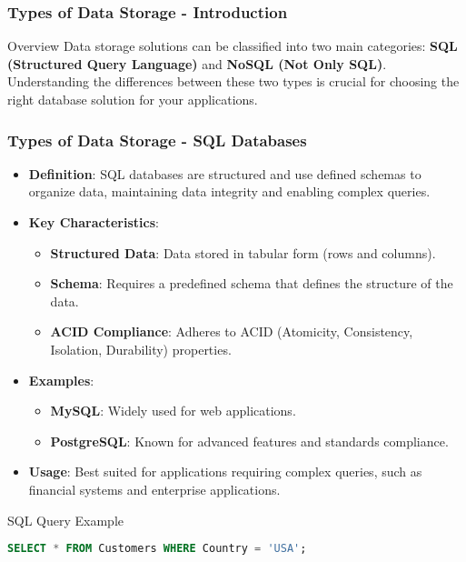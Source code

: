 \documentclass[aspectratio=169]{beamer}
\begin{document}
\begin{frame}[fragile]
    \frametitle{Types of Data Storage - Introduction}
    \begin{block}{Overview}
        Data storage solutions can be classified into two main categories: 
        \textbf{SQL (Structured Query Language)} and \textbf{NoSQL (Not Only SQL)}.
        Understanding the differences between these two types is crucial for choosing the right database solution for your applications.
    \end{block}
\end{frame}

\begin{frame}[fragile]
    \frametitle{Types of Data Storage - SQL Databases}
    \begin{itemize}
        \item \textbf{Definition}: 
            SQL databases are structured and use defined schemas to organize data, 
            maintaining data integrity and enabling complex queries.
        
        \item \textbf{Key Characteristics}:
            \begin{itemize}
                \item \textbf{Structured Data}: Data stored in tabular form (rows and columns).
                \item \textbf{Schema}: Requires a predefined schema that defines the structure of the data.
                \item \textbf{ACID Compliance}: Adheres to ACID (Atomicity, Consistency, Isolation, Durability) properties.
            \end{itemize}
        
        \item \textbf{Examples}:
            \begin{itemize}
                \item \textbf{MySQL}: Widely used for web applications.
                \item \textbf{PostgreSQL}: Known for advanced features and standards compliance.
            \end{itemize}
        
        \item \textbf{Usage}: 
            Best suited for applications requiring complex queries, such as financial systems and enterprise applications.
    \end{itemize}
    
    \begin{block}{SQL Query Example}
        \begin{lstlisting}[language=SQL]
SELECT * FROM Customers WHERE Country = 'USA';
        \end{lstlisting}
    \end{block}
\end{frame}
\end{document}
